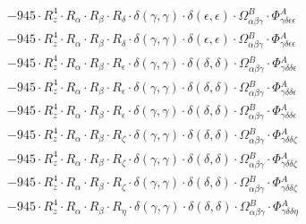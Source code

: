 \documentclass{article}
\begin{document}
\begin{subequations}
\begin{gather}
\begin{array}{c}
 \\[0.2em] 		 - 945 \cdot R_{z}^{4} \cdot R_{\alpha{}} \cdot R_{\beta{}} \cdot R_{\delta{}} \cdot \delta{}\left(\gamma{}, \gamma{}\right) \cdot \delta{}\left(\epsilon{}, \epsilon{}\right) \cdot \Omega{}^{B}_{\alpha{}\beta{}\gamma{}} \cdot \Phi{}^{A}_{\gamma{}\delta{}\epsilon{}\epsilon{}} 
 \\[0.2em] 		 - 945 \cdot R_{z}^{4} \cdot R_{\alpha{}} \cdot R_{\beta{}} \cdot R_{\delta{}} \cdot \delta{}\left(\gamma{}, \gamma{}\right) \cdot \delta{}\left(\epsilon{}, \epsilon{}\right) \cdot \Omega{}^{B}_{\alpha{}\beta{}\gamma{}} \cdot \Phi{}^{A}_{\gamma{}\delta{}\epsilon{}\epsilon{}} 
 \\[0.2em] 		 - 945 \cdot R_{z}^{4} \cdot R_{\alpha{}} \cdot R_{\beta{}} \cdot R_{\epsilon{}} \cdot \delta{}\left(\gamma{}, \gamma{}\right) \cdot \delta{}\left(\delta{}, \delta{}\right) \cdot \Omega{}^{B}_{\alpha{}\beta{}\gamma{}} \cdot \Phi{}^{A}_{\gamma{}\delta{}\delta{}\epsilon{}} 
 \\[0.2em] 		 - 945 \cdot R_{z}^{4} \cdot R_{\alpha{}} \cdot R_{\beta{}} \cdot R_{\epsilon{}} \cdot \delta{}\left(\gamma{}, \gamma{}\right) \cdot \delta{}\left(\delta{}, \delta{}\right) \cdot \Omega{}^{B}_{\alpha{}\beta{}\gamma{}} \cdot \Phi{}^{A}_{\gamma{}\delta{}\delta{}\epsilon{}} 
 \\[0.2em] 		 - 945 \cdot R_{z}^{4} \cdot R_{\alpha{}} \cdot R_{\beta{}} \cdot R_{\epsilon{}} \cdot \delta{}\left(\gamma{}, \gamma{}\right) \cdot \delta{}\left(\delta{}, \delta{}\right) \cdot \Omega{}^{B}_{\alpha{}\beta{}\gamma{}} \cdot \Phi{}^{A}_{\gamma{}\delta{}\delta{}\epsilon{}} 
 \\[0.2em] 		 - 945 \cdot R_{z}^{4} \cdot R_{\alpha{}} \cdot R_{\beta{}} \cdot R_{\zeta{}} \cdot \delta{}\left(\gamma{}, \gamma{}\right) \cdot \delta{}\left(\delta{}, \delta{}\right) \cdot \Omega{}^{B}_{\alpha{}\beta{}\gamma{}} \cdot \Phi{}^{A}_{\gamma{}\delta{}\delta{}\zeta{}} 
 \\[0.2em] 		 - 945 \cdot R_{z}^{4} \cdot R_{\alpha{}} \cdot R_{\beta{}} \cdot R_{\zeta{}} \cdot \delta{}\left(\gamma{}, \gamma{}\right) \cdot \delta{}\left(\delta{}, \delta{}\right) \cdot \Omega{}^{B}_{\alpha{}\beta{}\gamma{}} \cdot \Phi{}^{A}_{\gamma{}\delta{}\delta{}\zeta{}} 
 \\[0.2em] 		 - 945 \cdot R_{z}^{4} \cdot R_{\alpha{}} \cdot R_{\beta{}} \cdot R_{\zeta{}} \cdot \delta{}\left(\gamma{}, \gamma{}\right) \cdot \delta{}\left(\delta{}, \delta{}\right) \cdot \Omega{}^{B}_{\alpha{}\beta{}\gamma{}} \cdot \Phi{}^{A}_{\gamma{}\delta{}\delta{}\zeta{}} 
 \\[0.2em] 		 - 945 \cdot R_{z}^{4} \cdot R_{\alpha{}} \cdot R_{\beta{}} \cdot R_{\eta{}} \cdot \delta{}\left(\gamma{}, \gamma{}\right) \cdot \delta{}\left(\delta{}, \delta{}\right) \cdot \Omega{}^{B}_{\alpha{}\beta{}\gamma{}} \cdot \Phi{}^{A}_{\gamma{}\delta{}\delta{}\eta{}} 

\end{array}
\end{gather}
\end{subequations}
\end{document}
